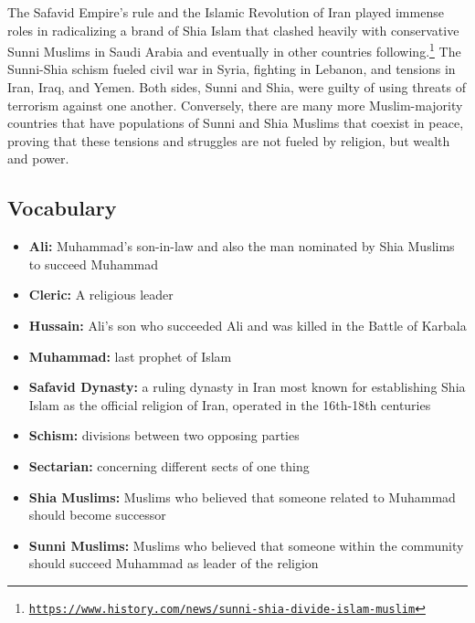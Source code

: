 \documentclass[10pt, letterpaper]{article}
\begin{document}
The Safavid Empire's rule and the Islamic Revolution of Iran played
immense roles in radicalizing a brand of Shia Islam that clashed heavily
with conservative Sunni Muslims in Saudi Arabia and eventually in other
countries following.\footnote{\texttt{\href{https://www.history.com/news/sunni-shia-divide-islam-muslim}{{https://www.history.com/news/sunni-shia-divide-islam-muslim}}}}
The Sunni-Shia schism fueled civil war in Syria, fighting in Lebanon,
and tensions in Iran, Iraq, and Yemen. Both sides, Sunni and Shia, were
guilty of using threats of terrorism against one another. Conversely,
there are many more Muslim-majority countries that have populations of
Sunni and Shia Muslims that coexist in peace, proving that these
tensions and struggles are not fueled by religion, but wealth and power. \\

\subsection{Vocabulary}

\begin{itemize}
\item
  
  \textbf{Ali:} Muhammad's son-in-law and also the man nominated by Shia
  Muslims to succeed Muhammad
  
\item
  
  \textbf{Cleric:} A religious leader
  
\item
  
  \textbf{Hussain:} Ali's son who succeeded Ali and was killed in the
  Battle of Karbala
  
\item
  
  \textbf{Muhammad:} last prophet of Islam
  
\item
  
  \textbf{Safavid Dynasty:} a ruling dynasty in Iran most known for
  establishing Shia Islam as the official religion of Iran, operated in
  the 16th-18th centuries
  
\item
  
  \textbf{Schism:} divisions between two opposing parties
  
\item
  
  \textbf{Sectarian:} concerning different sects of one thing
  
\item
  
  \textbf{Shia Muslims:} Muslims who believed that someone related to
  Muhammad should become successor
  
\item
  
  \textbf{Sunni Muslims:} Muslims who believed that someone within the
  community should succeed Muhammad as leader of the religion
  
\end{itemize}
\end{document}
